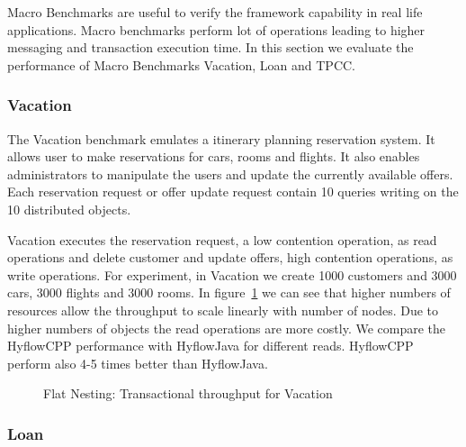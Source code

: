 \documentclass[12pt,english]{report}
\begin{document}
Macro Benchmarks are useful to verify the framework capability in real life applications. Macro benchmarks perform lot of operations leading to higher messaging and transaction execution time. In this section we evaluate the performance of Macro Benchmarks Vacation, Loan and TPCC.

\subsubsection{Vacation}

The Vacation benchmark emulates a itinerary planning reservation system. It allows user to make reservations for cars, rooms and flights. It also enables administrators to manipulate the users and update the currently available offers. Each reservation request or offer update request contain 10 queries writing on the 10 distributed objects. 

Vacation executes the reservation request, a low contention operation, as read operations and delete customer and update offers, high contention operations, as write operations. For experiment, in Vacation we create 1000 customers and 3000 cars, 3000 flights and 3000 rooms. In figure~\ref{Fig:flatVacation} we can see  that higher numbers of resources allow the throughput to scale linearly with number of nodes. Due to higher numbers of objects the read operations are more costly. We compare the HyflowCPP performance with HyflowJava for different reads. HyflowCPP perform also 4-5 times better than HyflowJava. 

\begin{figure}[H]
\centering
{}
\end{figure}
\begin{figure}[H]
\centering
{}
\end{figure}

\begin{figure}[H]
\centering
{}
\caption{Flat Nesting: Transactional throughput for Vacation}
\label{Fig:flatVacation}
\end{figure}

\subsubsection{Loan}
\end{document}
